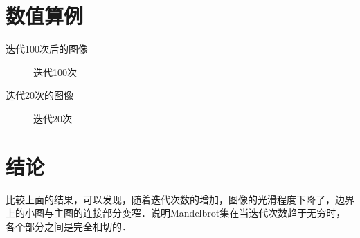 \documentclass[12pt,a4paper]{ctexart}
\begin{document}
\section{数值算例}
迭代100次后的图像
\begin{figure}[H]
   \hspace{0.5in}
   \caption{迭代100次}
      
\end{figure}
迭代20次的图像
\begin{figure}[H]
  \hspace{0.5in}
  \caption{迭代20次}
\end{figure}

\section{结论}
比较上面的结果，可以发现，随着迭代次数的增加，图像的光滑程度下降了，边界上的小图与主图的连接部分变窄．说明Mandelbrot集在当迭代次数趋于无穷时，各个部分之间是完全相切的．

  
\end{document}
